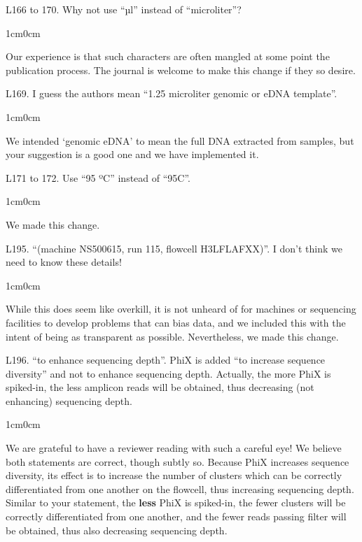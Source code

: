 \documentclass{article}
\newenvironment{response}
	{
	\begin{adjustwidth}{1cm}{0cm}
	\itshape %
	}
	{
	\end{adjustwidth}
	}
\begin{document}
L166 to 170. Why not use ``µl'' instead of ``microliter''?
\begin{response}
  Our experience is that such characters are often mangled at some point the publication process. The journal is welcome to make this change if they so desire.\\
\end{response}

L169. I guess the authors mean ``1.25 microliter genomic or eDNA template''.
\begin{response}
  We intended `genomic eDNA' to mean the full DNA extracted from samples, but your suggestion is a good one and we have implemented it.\\
\end{response}

L171 to 172. Use ``95 ºC'' instead of ``95C''.
\begin{response}
  We made this change.\\
\end{response}

L195. ``(machine NS500615, run 115, flowcell H3LFLAFXX)''. I don't think we need to know these details!
\begin{response}
  While this does seem like overkill, it is not unheard of for machines or sequencing facilities to develop problems that can bias data, and we included this with the intent of being as transparent as possible. Nevertheless, we made this change.\\
\end{response}

L196. ``to enhance sequencing depth''. PhiX is added ``to increase sequence diversity'' and not to enhance sequencing depth. Actually, the more PhiX is spiked-in, the less amplicon reads will be obtained, thus decreasing (not enhancing) sequencing depth.
\begin{response}
  We are grateful to have a reviewer reading with such a careful eye! We believe both statements are correct, though subtly so. Because PhiX increases sequence diversity, its effect is to increase the number of clusters which can be correctly differentiated from one another on the flowcell, thus increasing sequencing depth. Similar to your statement, the \textbf{less} PhiX is spiked-in, the fewer clusters will be correctly differentiated from one another, and the fewer reads passing filter will be obtained, thus also decreasing sequencing depth.\\
\end{response}
\end{document}
